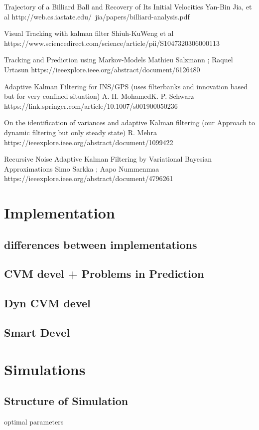 \documentclass[notitlepage, a4paper, 11pt]{scrartcl}
\begin{document}
\begin{multicols}{2}
Trajectory of a Billiard Ball and Recovery of Its Initial Velocities
Yan-Bin Jia, et al http://web.cs.iastate.edu/~jia/papers/billiard-analysis.pdf

Visual Tracking with kalman filter
Shiuh-KuWeng et al https://www.sciencedirect.com/science/article/pii/S1047320306000113

Tracking and Prediction using Markov-Models
Mathieu Salzmann ; Raquel Urtasun https://ieeexplore.ieee.org/abstract/document/6126480

Adaptive Kalman Filtering for INS/GPS (uses filterbanks and innovation based but for very confined situation)
A. H. MohamedK. P. Schwarz https://link.springer.com/article/10.1007/s001900050236

On the identification of variances and adaptive Kalman filtering (our Approach to dynamic filtering  but only steady state)
R. Mehra https://ieeexplore.ieee.org/abstract/document/1099422

Recursive Noise Adaptive Kalman Filtering by Variational Bayesian Approximations
Simo Sarkka ; Aapo Nummenmaa https://ieeexplore.ieee.org/abstract/document/4796261

\section{Implementation}
\subsection{differences between implementations}

\subsection{CVM devel + Problems in Prediction}
\subsection{Dyn CVM devel}
\subsection{Smart Devel}

\section{Simulations}

\subsection{Structure of Simulation}
optimal parameters


\end{multicols}
\end{document}
